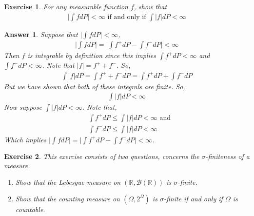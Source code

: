 \documentclass[12pt]{article}
\theoremstyle{colon}
\newtheorem{exercise}{Exercise}
\newtheorem*{answer}{Answer}
\begin{document}
\clearpage

\begin{exercise}
  For any measurable function $f$, show that
  \begin{gather*}
    \bigg\lvert \int f dP \bigg\rvert < \infty \text{ if and only if } \int \lvert f \rvert dP < \infty
  \end{gather*}
\end{exercise}

\begin{answer}
  Suppose that $\big\lvert \int f dP \big\rvert < \infty$,
  \begin{gather*}
    \bigg\lvert \int f dP \bigg\rvert = \bigg\lvert \int f^+ dP - \int f^- dP \bigg\rvert < \infty
  \end{gather*}
  Then $f$ is integrable by definition since this implies $\int f^+ dP < \infty$ and $\int f^- dP < \infty$. Note that $\lvert f \rvert = f^+ + f^-$. So,
  \begin{gather*}
    \int \lvert f \rvert dP = \int f^+ + f^- dP = \int f^+ dP + \int f^- dP
  \end{gather*}
  But we have shown that both of these integrals are finite. So,
  \begin{gather*}
    \int \lvert f \rvert dP < \infty
  \end{gather*}
  Now suppose $\int \lvert f \rvert dP < \infty$. Note that,
  \begin{align*}
    &\int f^+ dP \leq \int \lvert f \rvert dP < \infty \text{ and} \\
    &\int f^- dP \leq \int \lvert f \rvert dP < \infty
  \end{align*}
  Which implies $\bigg\lvert \int f dP \bigg\rvert = \bigg\lvert \int f^+ dP - \int f^- dP \bigg\rvert < \infty$.
\end{answer}

\clearpage

\begin{exercise}
  This exercise consists of two questions, concerns the $\sigma$-finiteness of a measure.
  \begin{enumerate}[label=\arabic*)]
    \item Show that the Lebesgue measure on $(\mathbb{R}, \mathcal{B}(\mathbb{R}))$ is $\sigma$-finite.
    \item Show that the counting measure on $(\Omega, 2^\Omega)$ is $\sigma$-finite if and only if $\Omega$ is countable.
  \end{enumerate}
\end{exercise}
\end{document}
